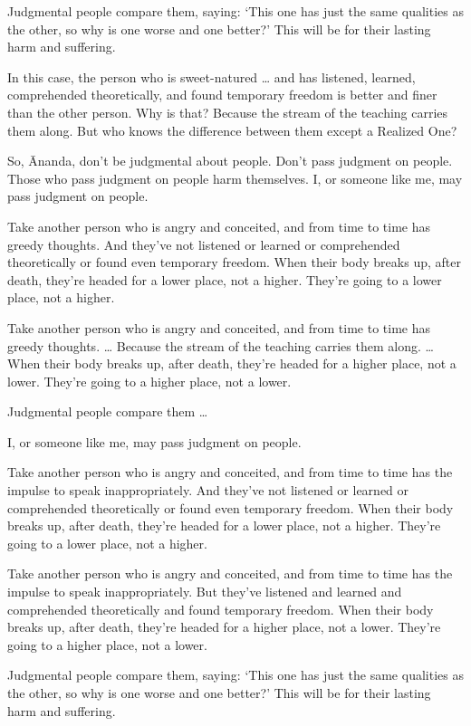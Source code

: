 \documentclass[12pt,openany]{book}%
\begin{document}
Judgmental people compare them, saying: ‘This one has just the same qualities as the other, so why is one worse and one better?’ This will be for their lasting harm and suffering. 

In this case, the person who is sweet-natured … and has listened, learned, comprehended theoretically, and found temporary freedom is better and finer than the other person. Why is that? Because the stream of the teaching carries them along. But who knows the difference between them except a Realized One? 

So, Ānanda, don’t be judgmental about people. Don’t pass judgment on people. Those who pass judgment on people harm themselves. I, or someone like me, may pass judgment on people. 

Take another person who is angry and conceited, and from time to time has greedy thoughts. And they’ve not listened or learned or comprehended theoretically or found even temporary freedom. When their body breaks up, after death, they’re headed for a lower place, not a higher. They’re going to a lower place, not a higher. 

Take another person who is angry and conceited, and from time to time has greedy thoughts. … Because the stream of the teaching carries them along. … When their body breaks up, after death, they’re headed for a higher place, not a lower. They’re going to a higher place, not a lower. 

Judgmental people compare them … 

I, or someone like me, may pass judgment on people. 

Take another person who is angry and conceited, and from time to time has the impulse to speak inappropriately. And they’ve not listened or learned or comprehended theoretically or found even temporary freedom. When their body breaks up, after death, they’re headed for a lower place, not a higher. They’re going to a lower place, not a higher. 

Take another person who is angry and conceited, and from time to time has the impulse to speak inappropriately. But they’ve listened and learned and comprehended theoretically and found temporary freedom. When their body breaks up, after death, they’re headed for a higher place, not a lower. They’re going to a higher place, not a lower. 

Judgmental people compare them, saying: ‘This one has just the same qualities as the other, so why is one worse and one better?’ This will be for their lasting harm and suffering. 
\end{document}
